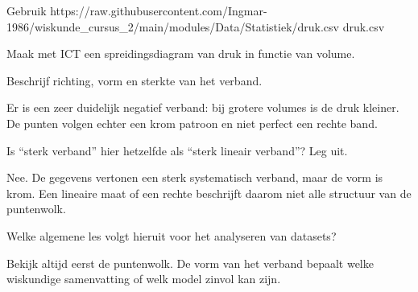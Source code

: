 \documentclass{ximera}
\begin{document}
\begin{oefening}{\oefU \ESS}

Gebruik \csv
{https://raw.githubusercontent.com/Ingmar-1986/wiskunde_cursus_2/main/modules/Data/Statistiek/druk.csv}
{druk.csv}

Maak met ICT een spreidingsdiagram van druk in functie van volume.

\begin{question}
Beschrijf richting, vorm en sterkte van het verband.

\begin{oplossing}
Er is een zeer duidelijk negatief verband: bij grotere volumes is de
druk kleiner. De punten volgen echter een krom patroon en niet
perfect een rechte band.
\end{oplossing}
\end{question}

\begin{question}
Is ``sterk verband'' hier hetzelfde als ``sterk lineair verband''?
Leg uit.

\begin{oplossing}
Nee. De gegevens vertonen een sterk systematisch verband, maar de
vorm is krom. Een lineaire maat of een rechte beschrijft daarom niet
alle structuur van de puntenwolk.
\end{oplossing}
\end{question}

\begin{question}
Welke algemene les volgt hieruit voor het analyseren van datasets?

\begin{oplossing}
Bekijk altijd eerst de puntenwolk. De vorm van het verband bepaalt
welke wiskundige samenvatting of welk model zinvol kan zijn.
\end{oplossing}
\end{question}

\end{oefening}
\end{document}
